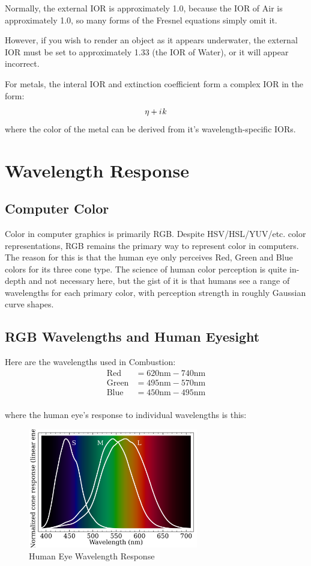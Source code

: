 \documentclass[12pt,letterpaper]{article}
\newcommand{\iu}{{i\mkern1mu}}
\begin{document}
Normally, the external IOR is approximately 1.0, because the IOR of Air is approximately 1.0, 
so many forms of the Fresnel equations simply omit it.

However, if you wish to render an object as it appears underwater, the external IOR must be set to approximately 1.33 (the IOR of Water), 
or it will appear incorrect.

For metals, the interal IOR and extinction coefficient form a complex IOR in the form:
$$\eta + \iu k$$
where the color of the metal can be derived from it's wavelength-specific IORs.

\newpage

\section{Wavelength Response}

\subsection{Computer Color}

Color in computer graphics is primarily RGB. Despite HSV/HSL/YUV/etc. color representations, RGB remains the primary way to 
represent color in computers. The reason for this is that the human eye only perceives Red, Green and Blue colors for its three cone type.
The science of human color perception is quite in-depth and not necessary here, but the gist of it is that humans see a range of wavelengths
for each primary color, with perception strength in roughly Gaussian curve shapes.

\subsection{RGB Wavelengths and Human Eyesight}

Here are the wavelengths used in Combustion:
\begin{align*}
    \text{Red}   &= 620\text{nm} - 740\text{nm}\\
    \text{Green} &= 495\text{nm} - 570\text{nm}\\
    \text{Blue}  &= 450\text{nm} - 495\text{nm}\\
\end{align*}

where the human eye's response to individual wavelengths is this:
\begin{figure}[htbp]
    \centering
    \includegraphics[width=20em]{Cone-fundamentals-with-srgb-spectrum}
    \caption{Human Eye Wavelength Response}
    \label{fig:eye_wavelength_response}
\end{figure}
\end{document}
